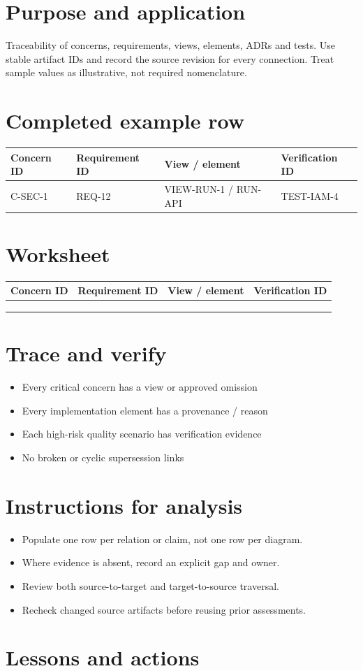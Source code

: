 \documentclass[10pt,letterpaper]{article}
\begin{document}
\DocProvenance
\section{Purpose and application}
Traceability of concerns, requirements, views, elements, ADRs and tests. Use stable artifact IDs and record the source revision for every connection. Treat sample values as illustrative, not required nomenclature.

\section{Completed example row}
\small
\begin{tabularx}{\linewidth}{@{}YYYY@{}}
\toprule
\textbf{Concern ID} & \textbf{Requirement ID} & \textbf{View / element} & \textbf{Verification ID} \\
\midrule
C-SEC-1 & REQ-12 & VIEW-RUN-1 / RUN-API & TEST-IAM-4 \\
\bottomrule
\end{tabularx}
\normalsize
\section{Worksheet}
\small
\begin{tabularx}{\linewidth}{@{}YYYY@{}}
\toprule
\textbf{Concern ID} & \textbf{Requirement ID} & \textbf{View / element} & \textbf{Verification ID} \\
\midrule
 &  &  &  \\
 &  &  &  \\
 &  &  &  \\
\bottomrule
\end{tabularx}
\normalsize
\section{Trace and verify}
\begin{itemize}
\item Every critical concern has a view or approved omission
\item Every implementation element has a provenance / reason
\item Each high-risk quality scenario has verification evidence
\item No broken or cyclic supersession links
\end{itemize}
\section{Instructions for analysis}
\begin{itemize}
\item Populate one row per relation or claim, not one row per diagram.
\item Where evidence is absent, record an explicit gap and owner.
\item Review both source-to-target and target-to-source traversal.
\item Recheck changed source artifacts before reusing prior assessments.
\end{itemize}
\section{Lessons and actions}
\end{document}
